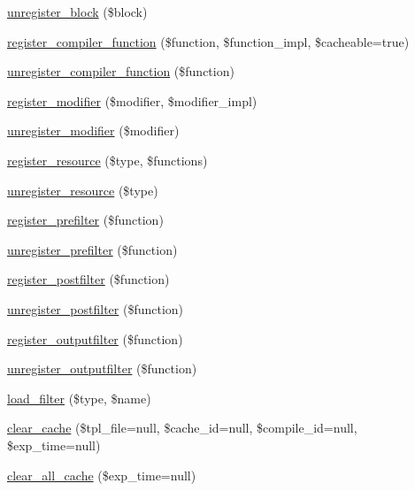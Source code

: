 \begin{DoxyCompactItemize}
\item 
\mbox{\hyperlink{class_smarty_a03303402061e87a18c3229d761334116}{unregister\+\_\+block}} (\$block)
\item 
\mbox{\hyperlink{class_smarty_adeb69ae009b03fcfa4381b8b17e7cf05}{register\+\_\+compiler\+\_\+function}} (\$function, \$function\+\_\+impl, \$cacheable=true)
\item 
\mbox{\hyperlink{class_smarty_a7321cec6b04848348e82f3928bb4341f}{unregister\+\_\+compiler\+\_\+function}} (\$function)
\item 
\mbox{\hyperlink{class_smarty_a09bb18ca76e160136514e2b0ab197384}{register\+\_\+modifier}} (\$modifier, \$modifier\+\_\+impl)
\item 
\mbox{\hyperlink{class_smarty_a6240087cdda905b9f71594fe79c352bc}{unregister\+\_\+modifier}} (\$modifier)
\item 
\mbox{\hyperlink{class_smarty_acdc1ccac51bd5143aaccd10f8835563c}{register\+\_\+resource}} (\$type, \$functions)
\item 
\mbox{\hyperlink{class_smarty_aced4c3f27800c1a81c652fcf39fe9364}{unregister\+\_\+resource}} (\$type)
\item 
\mbox{\hyperlink{class_smarty_adeb671e9364ac6c40f58c403975d1c45}{register\+\_\+prefilter}} (\$function)
\item 
\mbox{\hyperlink{class_smarty_a2c799f52830b86afa153afaaa79028e2}{unregister\+\_\+prefilter}} (\$function)
\item 
\mbox{\hyperlink{class_smarty_a9cfd52c89ae4cbe89352edc3e6ecc0bd}{register\+\_\+postfilter}} (\$function)
\item 
\mbox{\hyperlink{class_smarty_af2872f8df62adbe2314c8e98d0e896e4}{unregister\+\_\+postfilter}} (\$function)
\item 
\mbox{\hyperlink{class_smarty_adecdc831f296e4ec4f90cea9e87bd2db}{register\+\_\+outputfilter}} (\$function)
\item 
\mbox{\hyperlink{class_smarty_aebd7a64f2b6ab20862c91ec82b9e8970}{unregister\+\_\+outputfilter}} (\$function)
\item 
\mbox{\hyperlink{class_smarty_af90eebfe6a4534e81585c5cc8967e006}{load\+\_\+filter}} (\$type, \$name)
\item 
\mbox{\hyperlink{class_smarty_a612d4aff6b1a9724d7ded0b6cba53166}{clear\+\_\+cache}} (\$tpl\+\_\+file=null, \$cache\+\_\+id=null, \$compile\+\_\+id=null, \$exp\+\_\+time=null)
\item 
\mbox{\hyperlink{class_smarty_a80118ff3000706420d2432c29e1858a9}{clear\+\_\+all\+\_\+cache}} (\$exp\+\_\+time=null)

\end{DoxyCompactItemize}
